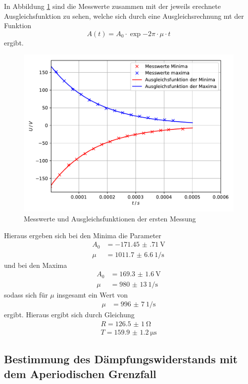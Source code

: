 \noindent In Abbildung \ref{fig:plot1} sind die Messwerte zusammen mit der jeweils erechnete Ausgleichsfunktion
zu sehen, welche sich durch eine Ausgleichsrechnung mt der Funktion
\begin{equation}
  A(t)= A_0 \cdot \exp{-2\pi \cdot \mu \cdot t}
\end{equation}
ergibt.
\begin{figure}[H]
  \centering
  \includegraphics{plot1.pdf}
  \caption{Messwerte und Ausgleichsfunktionen der ersten Messung}
  \label{fig:plot1}
\end{figure}

\noindent Hieraus ergeben sich bei den Minima die Parameter
\begin{align*}
  A_0 &= \SI{-171.45(71)}{\volt} \\
  \mu&= \SI{1011.7(66)}{1\per\second}
\end{align*}
und bei den Maxima
\begin{align*}
  A_0 &= \SI{169.3(16)}{\volt} \\
  \mu&= \SI{980(13)}{1\per\second}
\end{align*}
sodass sich für $ \mu $ insgesamt ein Wert von
\begin{align*}
  \mu &= \SI{996(7)}{1\per\second}
\end{align*}
ergibt.
Hieraus ergibt sich durch Gleichung %
\begin{align*}
  R= \SI{126.5(10)}{\ohm} \\
  T= \SI{159.9(12)}{\micro\second}
\end{align*}

\subsection{Bestimmung des Dämpfungswiderstands mit dem Aperiodischen Grenzfall}

